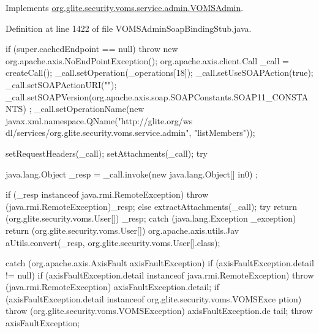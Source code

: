 Implements \hyperlink{interfaceorg_1_1glite_1_1security_1_1voms_1_1service_1_1admin_1_1VOMSAdmin_a338612f5e41990ac9ef0b070b09ffeeb}{org.glite.security.voms.service.admin.VOMSAdmin}.



Definition at line 1422 of file VOMSAdminSoapBindingStub.java.


\begin{DoxyCode}
                                                                                 
                                                                        {
        if (super.cachedEndpoint == null) {
            throw new org.apache.axis.NoEndPointException();
        }
        org.apache.axis.client.Call _call = createCall();
        _call.setOperation(_operations[18]);
        _call.setUseSOAPAction(true);
        _call.setSOAPActionURI("");
        _call.setSOAPVersion(org.apache.axis.soap.SOAPConstants.SOAP11_CONSTANTS)
      ;
        _call.setOperationName(new javax.xml.namespace.QName("http://glite.org/ws
      dl/services/org.glite.security.voms.service.admin", "listMembers"));

        setRequestHeaders(_call);
        setAttachments(_call);
 try {        java.lang.Object _resp = _call.invoke(new java.lang.Object[] {in0})
      ;

        if (_resp instanceof java.rmi.RemoteException) {
            throw (java.rmi.RemoteException)_resp;
        }
        else {
            extractAttachments(_call);
            try {
                return (org.glite.security.voms.User[]) _resp;
            } catch (java.lang.Exception _exception) {
                return (org.glite.security.voms.User[]) org.apache.axis.utils.Jav
      aUtils.convert(_resp, org.glite.security.voms.User[].class);
            }
        }
  } catch (org.apache.axis.AxisFault axisFaultException) {
    if (axisFaultException.detail != null) {
        if (axisFaultException.detail instanceof java.rmi.RemoteException) {
              throw (java.rmi.RemoteException) axisFaultException.detail;
         }
        if (axisFaultException.detail instanceof org.glite.security.voms.VOMSExce
      ption) {
              throw (org.glite.security.voms.VOMSException) axisFaultException.de
      tail;
         }
   }
  throw axisFaultException;
}
    }
\end{DoxyCode}
